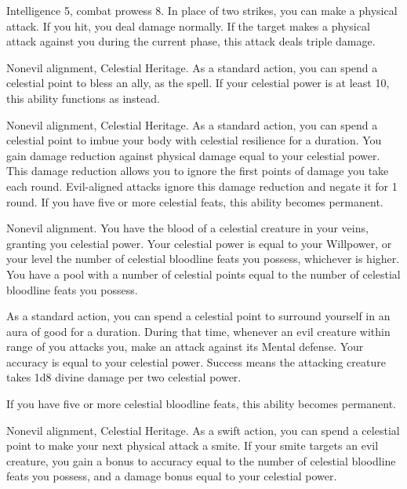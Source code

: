 \featpres Intelligence 5, combat prowess 8.
\featben In place of two strikes, you can make a physical attack.
If you hit, you deal damage normally.
If the target makes a physical attack against you during the current phase, this attack deals triple damage.

\featpres Nonevil alignment, Celestial Heritage.
\featben As a standard action, you can spend a celestial point to bless an ally, as the  spell.
If your celestial power is at least 10, this ability functions as  instead.

\featpres Nonevil alignment, Celestial Heritage.
\featben As a standard action, you can spend a celestial point to imbue your body with celestial resilience for a \durshort duration.
You gain damage reduction against physical damage equal to your celestial power.
This damage reduction allows you to ignore the first points of damage you take each round.
Evil-aligned attacks ignore this damage reduction and negate it for 1 round.
If you have five or more celestial feats, this ability becomes permanent.

\featpre Nonevil alignment.
\featben You have the blood of a celestial creature in your veins, granting you celestial power.
Your celestial power is equal to your Willpower, or your level \add the number of celestial bloodline feats you possess, whichever is higher.
You have a pool with a number of celestial points equal to the number of celestial bloodline feats you possess.

As a standard action, you can spend a celestial point to surround yourself in an aura of good for a \durshort duration.
During that time, whenever an evil creature within \rngclose range of you attacks you, make an attack against its Mental defense.
Your accuracy is equal to your celestial power.
Success means the attacking creature takes 1d8 divine damage per two celestial power.

If you have five or more celestial bloodline feats, this ability becomes permanent.

\featpres Nonevil alignment, Celestial Heritage.
\featben As a swift action, you can spend a celestial point to make your next physical attack a smite.
If your smite targets an evil creature, you gain a bonus to accuracy equal to the number of celestial bloodline feats you possess, and a damage bonus equal to your celestial power.

